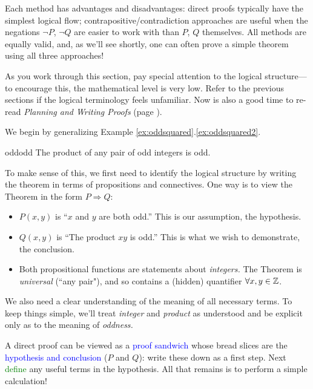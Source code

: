Each method has advantages and disadvantages: direct proofs typically have the simplest logical flow; contrapositive/contradiction approaches are useful when the negations $\neg P$, $\neg Q$ are easier to work with than $P$, $Q$ themselves. All methods are equally valid, and, as we'll see shortly, one can often prove a simple theorem using all three approaches!\smallbreak

As you work through this section, pay special attention to the logical structure---to encourage this, the mathematical level is very low. Refer to the previous sections if the logical terminology feels unfamiliar. Now is also a good time to re-read \emph{Planning and Writing Proofs} (page \pageref{sec:proofplan}).


We begin by generalizing Example \ref*{ex:oddsquared}.\ref{ex:oddsquared2}.

\begin{thm}{}{oddodd}
	The product of any pair of odd integers is odd.
\end{thm}

To make sense of this, we first need to identify the logical structure by writing the theorem in terms of propositions and connectives. One way is to view the Theorem in the form $P\Longrightarrow Q$:
\begin{itemize}
  \item $P(x,y)$ is ``$x$ and $y$ are both odd.'' This is our assumption, the hypothesis.
  \item $Q(x,y)$ is ``The product $xy$ is odd.'' This is what we wish to demonstrate, the conclusion.
  \item Both propositional functions are statements about \emph{integers.} The Theorem is \emph{universal} (``any pair"), and so contains a (hidden) quantifier $\forall x,y\in\mathbb{Z}$.
\end{itemize}
We also need a clear understanding of the meaning of all necessary terms. To keep things simple, we'll treat \emph{integer} and \emph{product} as understood and be explicit only as to the meaning of \emph{oddness.}\goodbreak


A direct proof can be viewed as a \textcolor{blue}{proof sandwich} whose bread slices are the \textcolor{blue}{hypothesis and conclusion} ($P$ and $Q$): write these down as a first step. Next \textcolor{Green}{define} any useful terms in the hypothesis. All that remains is to perform a simple calculation!


